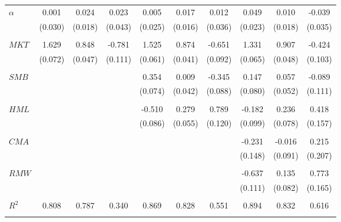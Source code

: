 \begin{tabular}{lccccccccc}
$\alpha$ & 0.001  & 0.024 & 0.023 & 0.005  & 0.017 & 0.012 & 0.049  & 0.010 & -0.039 \\ 
 & (0.030) & (0.018) & (0.043) & (0.025) & (0.016) & (0.036) & (0.023) & (0.018) & (0.035) \\ \\[-1.8ex] 
$MKT$ & 1.629   & 0.848   & -0.781 & 1.525  & 0.874 & -0.651 & 1.331  & 0.907 & -0.424 \\ 
               & (0.072) & (0.047) & (0.111) & (0.061) & (0.041) & (0.092) & (0.065) & (0.048) & (0.103) \\ \\[-1.8ex] 
$SMB$ &   &  &  & 0.354  & 0.009 & -0.345 & 0.147  & 0.057 & -0.089  \\ 
 &   &   &  &  (0.074) & (0.042) & (0.088) & (0.080) & (0.052) & (0.111) \\ \\[-1.8ex] $HML$ &   &  &  & -0.510  & 0.279 & 0.789 & -0.182  & 0.236 & 0.418 \\ 
       &    &   &  &  (0.086) & (0.055) & (0.120) & (0.099) & (0.078) & (0.157) \\ \\[-1.8ex] 
$CMA$ &   &  &  & & & & -0.231  & -0.016 & 0.215  \\ 
      &   &  &  & & & & (0.148) & (0.091) & (0.207) \\ \\[-1.8ex]
 $RMW$ &   &  &  & & & & -0.637  & 0.135 & 0.773  \\ 
      &   &  &  & & & & (0.111) & (0.082) & (0.165) \\ \\[-1.8ex] 
$R^2$ & 0.808  & 0.787 & 0.340 & 0.869  & 0.828 & 0.551 & 0.894  & 0.832 & 0.616 \\ \\[-1.8ex] 
\bottomrule 
\end{tabular}